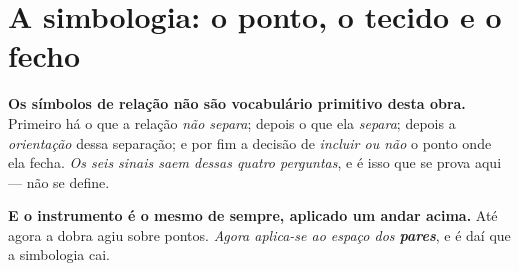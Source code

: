 \documentclass[livro.tex]{subfiles}
\begin{document}
\section{A simbologia: o ponto, o tecido e o fecho}\label{fis:simbolos}

\noindent \textbf{Os símbolos de relação não são vocabulário primitivo desta
obra.} Primeiro há o que a relação \emph{não separa}; depois o que ela
\emph{separa}; depois a \emph{orientação} dessa separação; e por fim a decisão de
\emph{incluir ou não} o ponto onde ela fecha. \emph{Os seis sinais saem dessas
quatro perguntas}, e é isso que se prova aqui --- não se define.

\medskip\noindent\textbf{E o instrumento é o mesmo de sempre, aplicado um andar
acima.} Até agora a dobra agiu sobre pontos. \emph{Agora aplica-se ao espaço dos
\textbf{pares}}, e é daí que a simbologia cai.
\end{document}

